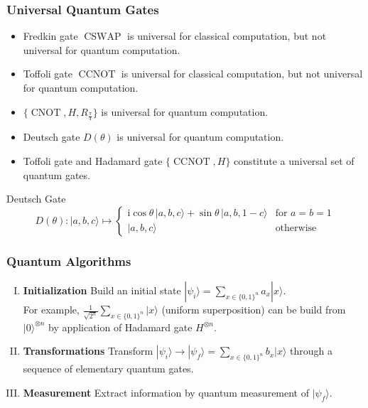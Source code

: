 \documentclass[UTF8,11pt,colorlinks,compress,openany]{beamer}%
\begin{document}
\begin{frame}\frametitle{Universal Quantum Gates}
	\begin{itemize}
		\item Fredkin gate $\operatorname{CSWAP}$ is universal for classical computation, but not universal for quantum computation.
		\item Toffoli gate $\operatorname{CCNOT}$ is universal for classical computation, but not universal for quantum computation.
		\item $\{\operatorname{CNOT},H,R_{\frac{\pi}{4}}\}$ is universal for quantum computation.
		\item Deutsch gate $D(\theta)$ is universal for quantum computation.
		\item Toffoli gate and Hadamard gate $\{\operatorname{CCNOT},H\}$ constitute a universal set of quantum gates.
	\end{itemize}
	\begin{block}{Deutsch Gate}
		\[D(\theta) : |a,b,c\rangle \mapsto \begin{cases} \mathrm{i}\cos\theta\,|a,b,c\rangle + \sin\theta\,|a,b,1-c\rangle & \mbox{for } a=b=1\\
		|a,b,c\rangle & \mbox{otherwise} \end{cases}\]
	\end{block}
\end{frame}

\begin{frame}\frametitle{Quantum Algorithms}
	\begin{enumerate}[I.]
		\item \textbf{Initialization} Build an initial state $|\psi_i\rangle=\sum\limits_{x\in\{0,1\}^n}a_x|x\rangle$.\\
		For example, $\frac{1}{\sqrt{2^n}}\sum\limits_{x\in\{0,1\}^n}|x\rangle$ (uniform superposition) can be build from $|0\rangle^{\otimes n}$ by application of Hadamard gate $H^{\otimes n}$.
		\item \textbf{Transformations} Transform $|\psi_i\rangle\to|\psi_f\rangle = \sum\limits_{x\in\{0,1\}^n} b_x|x\rangle$ through a sequence of elementary quantum gates.
		\item \textbf{Measurement} Extract information by quantum measurement of $|\psi_f\rangle$.
	\end{enumerate}
\end{frame}
\end{document}
